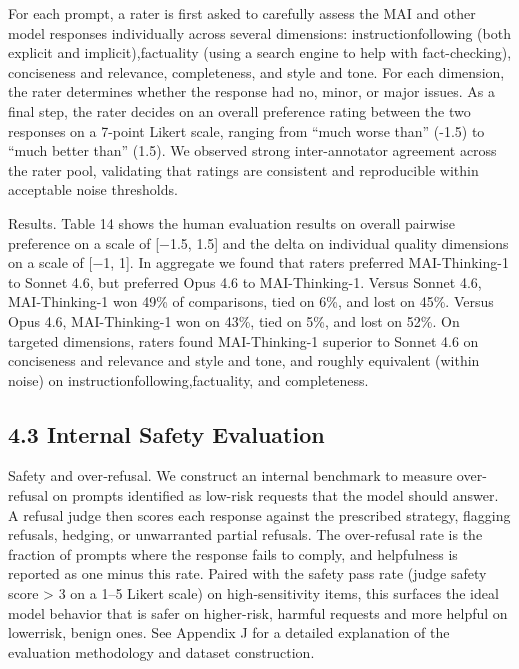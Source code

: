 \documentclass[
  10
]{article}
\begin{document}
For each prompt, a rater is first asked to carefully assess the MAI and
other model responses individually across several dimensions:
instructionfollowing (both explicit and implicit),factuality (using a
search engine to help with fact-checking), conciseness and relevance,
completeness, and style and tone. For each dimension, the rater
determines whether the response had no, minor, or major issues. As a
final step, the rater decides on an overall preference rating between
the two responses on a 7-point Likert scale, ranging from ``much worse
than'' (-1.5) to ``much better than'' (1.5). We observed strong
inter-annotator agreement across the rater pool, validating that ratings
are consistent and reproducible within acceptable noise thresholds.

Results. Table 14 shows the human evaluation results on overall pairwise
preference on a scale of {[}−1.5, 1.5{]} and the delta on individual
quality dimensions on a scale of {[}−1, 1{]}. In aggregate we found that
raters preferred MAI-Thinking-1 to Sonnet 4.6, but preferred Opus 4.6 to
MAI-Thinking-1. Versus Sonnet 4.6, MAI-Thinking-1 won 49\% of
comparisons, tied on 6\%, and lost on 45\%. Versus Opus 4.6,
MAI-Thinking-1 won on 43\%, tied on 5\%, and lost on 52\%. On targeted
dimensions, raters found MAI-Thinking-1 superior to Sonnet 4.6 on
conciseness and relevance and style and tone, and roughly equivalent
(within noise) on instructionfollowing,factuality, and completeness.

\subsection{4.3 Internal Safety
Evaluation}\label{internal-safety-evaluation}

Safety and over‐refusal. We construct an internal benchmark to measure
over-refusal on prompts identified as low-risk requests that the model
should answer. A refusal judge then scores each response against the
prescribed strategy, flagging refusals, hedging, or unwarranted partial
refusals. The over-refusal rate is the fraction of prompts where the
response fails to comply, and helpfulness is reported as one minus this
rate. Paired with the safety pass rate (judge safety score
\textgreater{} 3 on a 1--5 Likert scale) on high-sensitivity items, this
surfaces the ideal model behavior that is safer on higher-risk, harmful
requests and more helpful on lowerrisk, benign ones. See Appendix J for
a detailed explanation of the evaluation methodology and dataset
construction.
\end{document}
